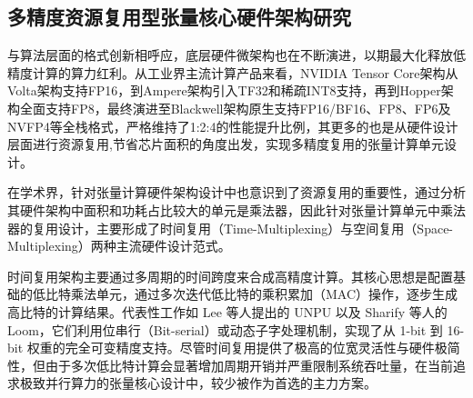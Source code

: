 \documentclass[10.5pt,compsoc,UTF8]{CjC}
\theoremstyle{mystyle}
\begin{document}
\subsection{多精度资源复用型张量核心硬件架构研究}

与算法层面的格式创新相呼应，底层硬件微架构也在不断演进，以期最大化释放低精度计算的算力红利。从工业界主流计算产品来看，NVIDIA Tensor Core架构从Volta\cite{volta}架构支持FP16，到Ampere\cite{nvidia2020ampere}架构引入TF32和稀疏INT8支持，再到Hopper\cite{nvidia2022hopper}架构全面支持FP8，最终演进至Blackwell\cite{nvidia2024blackwell}架构原生支持FP16/BF16、FP8、FP6及NVFP4等全栈格式，严格维持了1:2:4的性能提升比例，其更多的也是从硬件设计层面进行资源复用,节省芯片面积的角度出发，实现多精度复用的张量计算单元设计。

在学术界，针对张量计算硬件架构设计中也意识到了资源复用的重要性，通过分析其硬件架构中面积和功耗占比较大的单元是乘法器，因此针对张量计算单元中乘法器的复用设计，主要形成了时间复用（Time-Multiplexing）与空间复用（Space-Multiplexing）两种主流硬件设计范式。

时间复用架构主要通过多周期的时间跨度来合成高精度计算。其核心思想是配置基础的低比特乘法单元，通过多次迭代低比特的乘积累加（MAC）操作，逐步生成高比特的计算结果。代表性工作如 Lee 等人提出的 UNPU\cite{unpu} 以及 Sharify 等人的 Loom\cite{loom}，它们利用位串行（Bit-serial）或动态子字处理机制，实现了从 1-bit 到 16-bit 权重的完全可变精度支持。尽管时间复用提供了极高的位宽灵活性与硬件极简性，但由于多次低比特计算会显著增加周期开销并严重限制系统吞吐量，在当前追求极致并行算力的张量核心设计中，较少被作为首选的主力方案。
\end{document}
